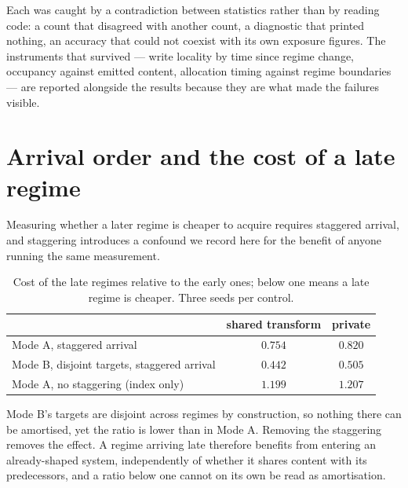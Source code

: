 \documentclass[11pt,a4paper]{article}
\begin{document}
Each was caught by a contradiction between statistics rather than by reading
code: a count that disagreed with another count, a diagnostic that printed
nothing, an accuracy that could not coexist with its own exposure figures. The
instruments that survived --- write locality by time since regime change,
occupancy against emitted content, allocation timing against regime boundaries
--- are reported alongside the results because they are what made the failures
visible.

\section{Arrival order and the cost of a late regime}
\label{app:arrival}

Measuring whether a later regime is cheaper to acquire requires staggered
arrival, and staggering introduces a confound we record here for the benefit of
anyone running the same measurement.

\begin{table}[h]
\centering
\begin{tabular}{lcc}
\toprule
 & shared transform & private \\
\midrule
Mode A, staggered arrival & $0.754$ & $0.820$ \\
Mode B, disjoint targets, staggered arrival & $0.442$ & $0.505$ \\
Mode A, no staggering (index only) & $1.199$ & $1.207$ \\
\bottomrule
\end{tabular}
\caption{Cost of the late regimes relative to the early ones; below one means
a late regime is cheaper. Three seeds per control.}
\end{table}

Mode B's targets are disjoint across regimes by construction, so nothing there
can be amortised, yet the ratio is lower than in Mode A. Removing the
staggering removes the effect. A regime arriving late therefore benefits from
entering an already-shaped system, independently of whether it shares content
with its predecessors, and a ratio below one cannot on its own be read as
amortisation.
\end{document}
